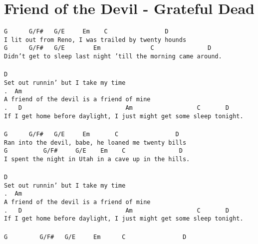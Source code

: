 \newpage
\section{Friend of the Devil - Grateful Dead}
\label{Friend of the Devil - Grateful Dead}
\texttt{G\ \ \ \ \ \ G/F\# \ \ G/E \ \ \ \ Em \ \ \ C\ \ \ \ \ \ \ \ \ \ \ \ \ \ \ \ D\\
I\ lit\ out\ from\ Reno,\ I\ was\ trailed\ by\ twenty\ hounds\\
G\ \ \ \ \ \ G/F\# \ \ G/E \ \ \ \ \ \ \ Em \ \ \ \ \ \ \ \ \ \ \ \ \ C\ \ \ \ \ \ \ \ \ \ \ \ \ \ \ D\\
Didn't\ get\ to\ sleep\ last\ night\ 'till\ the\ morning\ came\ around.\\
\\
D\\
Set\ out\ runnin'\ but\ I\ take\ my\ time\\
. \ Am\\
A\ friend\ of\ the\ devil\ is\ a\ friend\ of\ mine\\
. \ \ D\ \ \ \ \ \ \ \ \ \ \ \ \ \ \ \ \ \ \ \ \ \ \ \ \ \ \ \ \ Am\ \ \ \ \ \ \ \ \ \ \ \ \ \ \ \ \ \ C\ \ \ \ \ \ \ D\\
If\ I\ get\ home\ before\ daylight,\ I\ just\ might\ get\ some\ sleep\ tonight.\\
\\
G\ \ \ \ \ \ G/F\# \ \ G/E \ \ \ \ Em \ \ \ \ \ \ C\ \ \ \ \ \ \ \ \ \ \ \ \ \ \ \ D\\
Ran\ into\ the\ devil,\ babe,\ he\ loaned\ me\ twenty\ bills\\
G\ \ \ \ \ \ \ \ \ \ G/F\# \ \ \ \ G/E \ \ \ Em \ \ \ C\ \ \ \ \ \ \ \ \ \ \ \ \ \ \ D\\
I\ spent\ the\ night\ in\ Utah\ in\ a\ cave\ up\ in\ the\ hills.\\
\\
D\\
Set\ out\ runnin'\ but\ I\ take\ my\ time\\
. \ Am\\
A\ friend\ of\ the\ devil\ is\ a\ friend\ of\ mine\\
. \ \ D\ \ \ \ \ \ \ \ \ \ \ \ \ \ \ \ \ \ \ \ \ \ \ \ \ \ \ \ \ Am\ \ \ \ \ \ \ \ \ \ \ \ \ \ \ \ \ \ C\ \ \ \ \ \ \ D\\
If\ I\ get\ home\ before\ daylight,\ I\ just\ might\ get\ some\ sleep\ tonight.\\
\\
G\ \ \ \ \ \ \ \ \ G/F\# \ \ G/E \ \ \ \ Em \ \ \ \ \ C\ \ \ \ \ \ \ \ \ \ \ \ \ \ \ \ D\\
}
